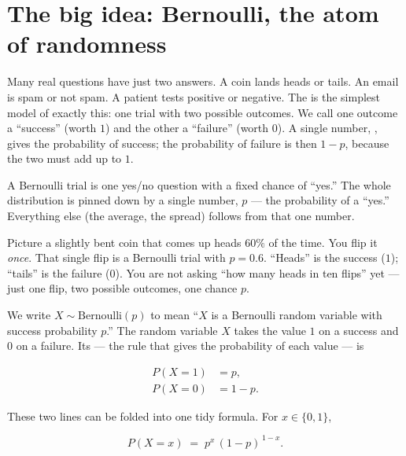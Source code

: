 \section{The big idea: Bernoulli, the atom of randomness}

Many real questions have just two answers. A coin lands heads or tails. An email
is spam or not spam. A patient tests positive or negative. The
 is the simplest model of exactly this: one trial
with two possible outcomes. We call one outcome a ``success'' (worth $1$) and the
other a ``failure'' (worth $0$). A single number, , gives the
probability of success; the probability of failure is then $1-p$, because the two
must add up to $1$.

\begin{intuition}
A Bernoulli trial is one yes/no question with a fixed chance of ``yes.'' The whole
distribution is pinned down by a single number, $p$ --- the probability of a
``yes.'' Everything else (the average, the spread) follows from that one number.
\end{intuition}

\begin{everyday}
Picture a slightly bent coin that comes up heads $60\%$ of the time. You flip it
\emph{once}. That single flip is a Bernoulli trial with $p = 0.6$. ``Heads'' is
the success ($1$); ``tails'' is the failure ($0$). You are not asking ``how many
heads in ten flips'' yet --- just one flip, two possible outcomes, one chance $p$.
\end{everyday}

We write $X \sim \text{Bernoulli}(p)$ to mean ``$X$ is a Bernoulli random variable
with success probability $p$.'' The random variable $X$ takes the value $1$ on a
success and $0$ on a failure. Its  --- the
rule that gives the probability of each value --- is

\begin{align}
  P(X = 1) &= p, \\
  P(X = 0) &= 1 - p .
\end{align}

These two lines can be folded into one tidy formula. For $x \in \{0,1\}$,

\begin{equation}
  P(X = x) \;=\; p^{x}\,(1-p)^{\,1-x}.
\end{equation}

